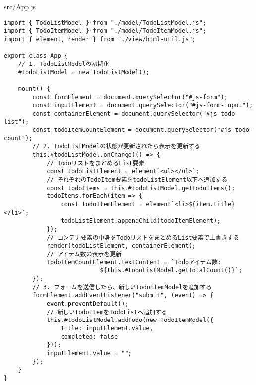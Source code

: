 \begin{listtitle}
src/App.js
\end{listtitle}
\begin{lstlisting}
import { TodoListModel } from "./model/TodoListModel.js";
import { TodoItemModel } from "./model/TodoItemModel.js";
import { element, render } from "./view/html-util.js";

export class App {
    // 1. TodoListModelの初期化
    #todoListModel = new TodoListModel();

    mount() {
        const formElement = document.querySelector("#js-form");
        const inputElement = document.querySelector("#js-form-input");
        const containerElement = document.querySelector("#js-todo-list");
        const todoItemCountElement = document.querySelector("#js-todo-count");
        // 2. TodoListModelの状態が更新されたら表示を更新する
        this.#todoListModel.onChange(() => {
            // TodoリストをまとめるList要素
            const todoListElement = element`<ul></ul>`;
            // それぞれのTodoItem要素をtodoListElement以下へ追加する
            const todoItems = this.#todoListModel.getTodoItems();
            todoItems.forEach(item => {
                const todoItemElement = element`<li>${item.title}</li>`;
                todoListElement.appendChild(todoItemElement);
            });
            // コンテナ要素の中身をTodoリストをまとめるList要素で上書きする
            render(todoListElement, containerElement);
            // アイテム数の表示を更新
            todoItemCountElement.textContent = `Todoアイテム数:
	                       ${this.#todoListModel.getTotalCount()}`;
        });
        // 3. フォームを送信したら、新しいTodoItemModelを追加する
        formElement.addEventListener("submit", (event) => {
            event.preventDefault();
            // 新しいTodoItemをTodoListへ追加する
            this.#todoListModel.addTodo(new TodoItemModel({
                title: inputElement.value,
                completed: false
            }));
            inputElement.value = "";
        });
    }
}
\end{lstlisting}
\listend
